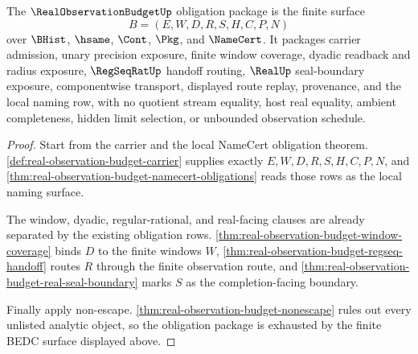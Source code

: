 \begin{theorem}
\label{thm:real-observation-budget-obligation-package}
The $\RealObservationBudgetUp$ obligation package is the finite surface
$$
B=(E,W,D,R,S,H,C,P,N)
$$
over $\BHist$, $\hsame$, $\Cont$, $\Pkg$, and $\NameCert$. It packages carrier admission, unary precision exposure, finite window coverage, dyadic readback and radius exposure, $\RegSeqRatUp$ handoff routing, $\RealUp$ seal-boundary exposure, componentwise transport, displayed route replay, provenance, and the local naming row, with no quotient stream equality, host real equality, ambient completeness, hidden limit selection, or unbounded observation schedule.
\end{theorem}
\begin{proof}
Start from the carrier and the local NameCert obligation theorem. \autoref{def:real-observation-budget-carrier} supplies exactly $E,W,D,R,S,H,C,P,N$, and \autoref{thm:real-observation-budget-namecert-obligations} reads those rows as the local naming surface.

The window, dyadic, regular-rational, and real-facing clauses are already separated by the existing obligation rows. \autoref{thm:real-observation-budget-window-coverage} binds $D$ to the finite windows $W$, \autoref{thm:real-observation-budget-regseq-handoff} routes $R$ through the finite observation route, and \autoref{thm:real-observation-budget-real-seal-boundary} marks $S$ as the completion-facing boundary.

Finally apply non-escape. \autoref{thm:real-observation-budget-nonescape} rules out every unlisted analytic object, so the obligation package is exhausted by the finite BEDC surface displayed above.
\end{proof}


